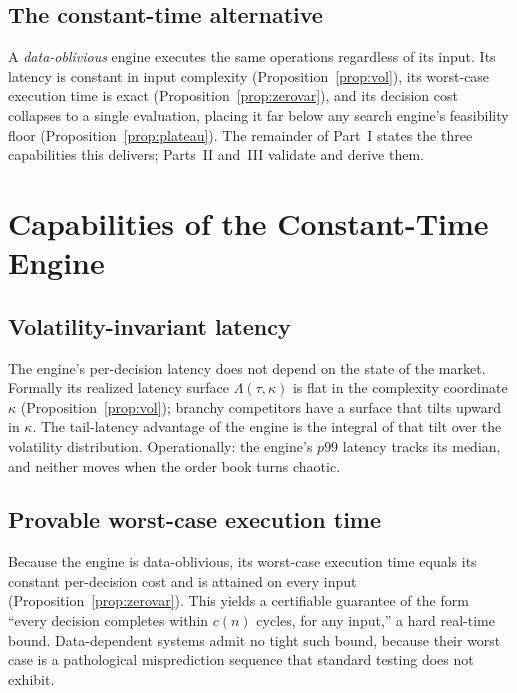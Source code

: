 \documentclass[11pt,oneside]{book}
\theoremstyle{definition}
\theoremstyle{plain}
\theoremstyle{remark}
\newcommand{\budget}{\tau}
\newcommand{\kvol}{\kappa}
\begin{document}
\section{The constant-time alternative}
A \emph{data-oblivious} engine executes the same operations regardless of its input. Its
latency is constant in input complexity (Proposition~\ref{prop:vol}), its worst-case
execution time is exact (Proposition~\ref{prop:zerovar}), and its decision cost collapses
to a single evaluation, placing it far below any search engine's feasibility floor
(Proposition~\ref{prop:plateau}). The remainder of Part~I states the three capabilities
this delivers; Parts~II and~III validate and derive them.

\chapter{Capabilities of the Constant-Time Engine}\label{ch:capabilities}

\section{Volatility-invariant latency}
The engine's per-decision latency does not depend on the state of the market. Formally its
realized latency surface $\Lambda(\budget,\kvol)$ is flat in the complexity coordinate
$\kvol$ (Proposition~\ref{prop:vol}); branchy competitors have a surface that tilts upward
in $\kvol$. The tail-latency advantage of the engine is the integral of that tilt over the
volatility distribution. Operationally: the engine's $p99$ latency tracks its median, and
neither moves when the order book turns chaotic.

\section{Provable worst-case execution time}
Because the engine is data-oblivious, its worst-case execution time equals its constant
per-decision cost and is attained on every input (Proposition~\ref{prop:zerovar}). This
yields a certifiable guarantee of the form ``every decision completes within $c(n)$
cycles, for any input,'' a hard real-time bound. Data-dependent systems admit no tight
such bound, because their worst case is a pathological misprediction sequence that
standard testing does not exhibit.
\end{document}
